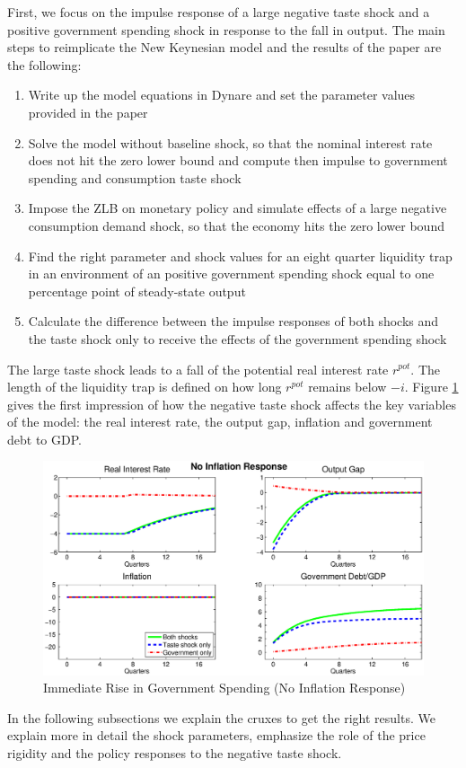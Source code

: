\documentclass[12pt,a4paper,oneside,titlepage]{article}
\begin{document}
First, we focus on the impulse response of a large negative taste shock and a positive government spending shock in response to the fall in output. The main steps to reimplicate the New Keynesian model and the results of the \citet{Erceg.2014} paper are the following:
\begin{enumerate}
\item Write up the model equations in Dynare and set the parameter values provided in the paper\vspace{-0.3cm}
\item Solve the model without baseline shock, so that the nominal interest rate does not hit the zero lower bound and compute then impulse to government spending and consumption taste shock\vspace{-0.3cm}
\item Impose the ZLB on monetary policy and simulate effects of a large negative consumption demand shock, so that the economy hits the zero lower bound\vspace{-0.3cm}
\item Find the right parameter and shock values for an eight quarter liquidity trap in an environment of an positive government spending shock equal to one percentage point of steady-state output\vspace{-0.3cm}
\item Calculate the difference between the impulse responses of both shocks and the taste shock only to receive the effects of the government spending shock
\end{enumerate}
The large taste shock leads to a fall of the potential real interest rate $r^{pot}$. The length of the liquidity trap is defined on how long $r^{pot}$ remains below $-i$.
Figure \ref{IRnoinflation} gives the first impression of how the negative taste shock affects the key variables of the model: the real interest rate, the output gap, inflation and government debt to GDP.
\begin{figure}[p]
\includegraphics[width=\textwidth]{Paperpics/Figure2noIR}
\caption{Immediate Rise in Government Spending (No Inflation Response)}
\label{IRnoinflation}
\end{figure}
In the following subsections we explain the cruxes to get the right results. We explain more in detail the shock parameters, emphasize the role of the price rigidity and the policy responses to the negative taste shock.
\end{document}
